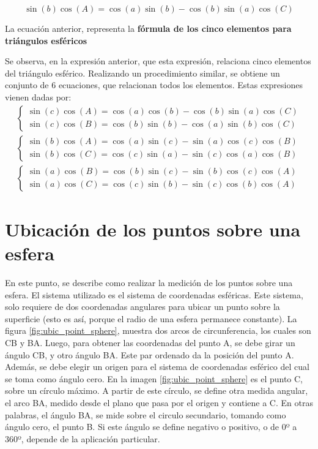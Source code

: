\begin{equation}
	\sin(b)\cos(A) = \cos(a)\sin(b) - \cos(b)\sin(a)\cos(C) 
\end{equation}

La ecuación anterior, representa la \textbf{fórmula de los cinco elementos para triángulos esféricos} 

Se observa, en la expresión anterior, que esta expresión, relaciona cinco elementos del triángulo esférico. Realizando un procedimiento similar, se obtiene un conjunto de 6 ecuaciones, que relacionan todos los elementos. Estas expresiones vienen dadas por: 
\begin{align}
	\begin{cases}	
		\sin(c)\cos(A) = \cos(a)\cos(b) - \cos(b) \sin(a) \cos(C) \\
		\sin(c)\cos(B) = \cos(b)\sin(b) - \cos(a) \sin(b) \cos(C) 	
	\end{cases}
    \\
	\begin{cases}
		\sin(b)\cos(A) = \cos(a)\sin(c) - \sin(a) \cos(c) \cos(B) \\
		\sin(b)\cos(C) = \cos(c)\sin(a) - \sin(c) \cos(a) \cos(B) 	
    \end{cases}
	\\
	\begin{cases}
		\sin(a)\cos(B) = \cos(b)\sin(c) - \sin(b) \cos(c) \cos(A) \\
		\sin(a)\cos(C) = \cos(c)\sin(b) - \sin(c) \cos(b) \cos(A) 	
	\end{cases}
\end{align}


\section{Ubicación de los puntos sobre una esfera} 



En este punto, se describe como realizar la medición de los puntos sobre una esfera. El sistema utilizado es el sistema de coordenadas esféricas. Este sistema, solo requiere de dos coordenadas angulares para ubicar un punto sobre la superficie (esto es así, porque el radio de una esfera permanece constante). La figura \ref{fig:ubic_point_sphere}, muestra dos arcos de circunferencia, los cuales son CB y BA. Luego, para obtener las coordenadas del punto A, se debe girar un ángulo CB, y otro ángulo BA. Este par ordenado da la posición del punto A. Además, se debe elegir un origen para el sistema de coordenadas esférico del cual se toma como ángulo cero. En la imagen \ref{fig:ubic_point_sphere} es el punto C, sobre un círculo máximo. A partir de este círculo, se define otra medida angular, el arco BA, medido desde el plano que pasa por el origen y contiene a C. En otras palabras, el ángulo BA, se mide sobre el circulo secundario, tomando como ángulo cero, el punto B. Si este ángulo se define negativo o positivo, o de 0º a 360º, depende de la aplicación particular.  

